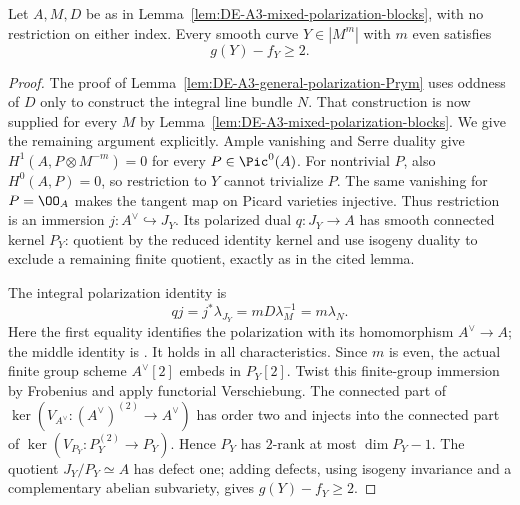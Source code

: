 \begin{lemma}
\label{lem:DE-A3-mixed-all-even-Prym}
Let $A,M,D$ be as in
Lemma~\ref{lem:DE-A3-mixed-polarization-blocks}, with no restriction
on either index.  Every smooth curve $Y\in|M^m|$ with $m$ even
satisfies
\[
                              g(Y)-f_Y\ge2.
\]
\end{lemma}
\begin{proof}
The proof of Lemma~\ref{lem:DE-A3-general-polarization-Prym}
uses oddness of $D$ only to construct the integral line bundle $N$.
That construction is now supplied for every $M$ by
Lemma~\ref{lem:DE-A3-mixed-polarization-blocks}.
We give the remaining argument explicitly.
Ample vanishing and Serre duality give
$H^1(A,P\otimes M^{-m})=0$ for every $P\in\Pic^0(A)$.
For nontrivial $P$, also $H^0(A,P)=0$, so restriction to $Y$
cannot trivialize $P$.  The same vanishing for $P=\OO_A$ makes
the tangent map on Picard varieties injective.  Thus restriction
is an immersion $j:A^\vee\hookrightarrow J_Y$.
Its polarized dual $q:J_Y\to A$ has smooth connected kernel $P_Y$:
quotient by the reduced identity kernel and use isogeny duality
to exclude a remaining finite quotient, exactly as in the cited lemma.

The integral polarization identity is
\[
                 qj=j^*\lambda_{J_Y}=mD\lambda_M^{-1}=m\lambda_N.
\]
Here the first equality identifies the polarization with its
homomorphism $A^\vee\to A$; the middle identity is
\cite[Section~3, equations~(3.2)--(3.3), pp.~346--347]
{Debarre1994Degrees}.  It holds in all characteristics.
Since $m$ is even, the actual finite group scheme $A^\vee[2]$
embeds in $P_Y[2]$.
Twist this finite-group immersion by Frobenius and apply functorial
Verschiebung.  The connected part of
$\ker(V_{A^\vee}:(A^\vee)^{(2)}\to A^\vee)$ has order two and injects
into the connected part of
$\ker(V_{P_Y}:P_Y^{(2)}\to P_Y)$.
Hence $P_Y$ has $2$-rank at most $\dim P_Y-1$.
The quotient $J_Y/P_Y\simeq A$ has defect one; adding defects,
using isogeny invariance and a complementary abelian subvariety,
gives $g(Y)-f_Y\ge2$.
\end{proof}

